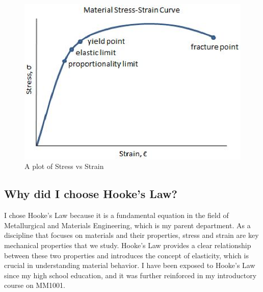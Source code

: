 \documentclass[12pt,a4paper]{article}
\begin{document}
\begin{figure}[H]
    \centering
    \includegraphics{hooke.eps}
    \caption{A plot of Stress vs Strain}
    \label{erfplot}
\end{figure}

\subsection{Why did I choose Hooke's Law?}
I chose Hooke's Law because it is a fundamental equation in the field of Metallurgical and Materials Engineering, which is my parent department. As a discipline that focuses on materials and their properties, stress and strain are key mechanical properties that we study. Hooke's Law provides a clear relationship between these two properties and introduces the concept of elasticity, which is crucial in understanding material behavior. I have been exposed to Hooke's Law since my high school education, and it was further reinforced in my introductory course on MM1001.



\end{document}

